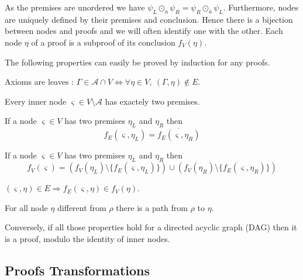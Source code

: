\documentclass{llncs}
\newcommand{\dual}[1]{{\ensuremath{\bar{#1}}}}
\begin{document}
As the premises are unordered we have $\psi_L \odot_a \psi_R = \psi_R \odot_\dual{a} \psi_L$.
Furthermore, nodes are uniquely defined by their premises and conclusion. Hence there is a bijection
between nodes and proofs and we will often identify one with the other. Each node $\eta$ of a proof
is a subproof of its conclusion $f_V(\eta)$.

The following properties can easily be proved by induction for any proofs.

\begin{property}
\label{prop:proof_leaf}
Axioms are leaves : $\Gamma \in \mathcal{A} \cap V \Leftrightarrow \forall \eta \in V ,~
(\Gamma,\eta) \notin E$.
\end{property}

\begin{property}
Every inner node $\varsigma \in V \setminus \mathcal{A}$ has exactely two premises.
\end{property}

\begin{property}
\label{prop:proof_edges}
If a node $\varsigma \in V$ has two premises $\eta_L$ and $\eta_R$ then
\begin{equation*}
f_E(\varsigma,\eta_L) = \overline{f_E(\varsigma,\eta_R)}
\end{equation*}
\end{property}

\begin{property}
\label{prop:proof_conclusion}
If a node $\varsigma \in V$ has two premises $\eta_L$ and $\eta_R$ then
\begin{equation*}
  f_V(\varsigma) =
  (f_V(\eta_L) \setminus \{f_E(\varsigma,\eta_L)\}) \cup
  (f_V(\eta_R) \setminus \{f_E(\varsigma,\eta_R)\})
\end{equation*}
\end{property}

\begin{property}
$(\varsigma,\eta) \in E \Rightarrow f_E(\varsigma,\eta) \in f_V(\eta)$.
\end{property}

\begin{property}
For all node $\eta$ different from $\rho$ there is a path from $\rho$ to $\eta$.
\end{property}

Conversely, if all those properties hold for a directed acyclic graph (DAG) then it is a proof,
modulo the identity of inner nodes.

\subsection{Proofs Transformations}
\end{document}
